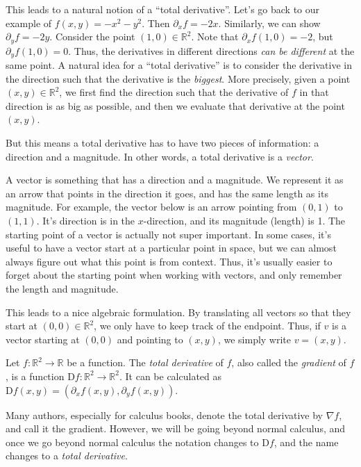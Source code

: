 This leads to a natural notion of a ``total derivative''. Let's go back to our example of $f(x,y) = -x^2 - y^2$. Then $\partial _xf =-2x$. Similarly, we can show $\partial _yf = -2y$. Consider the point $(1,0)\in\mathbb{R} ^2$. Note that $\partial _xf(1,0) = -2$, but $\partial _yf(1,0)=0$. Thus, the derivatives in different directions \emph{can be different} at the same point. A natural idea for a ``total derivative'' is to consider the derivative in the direction such that the derivative is the \emph{biggest}. More precisely, given a point $(x,y)\in\mathbb{R} ^2$, we first find the direction such that the derivative of $f$ in that direction is as big as possible, and then we evaluate that derivative at the point $(x,y)$.

But this means a total derivative has to have two pieces of information: a direction and a magnitude. In other words, a total derivative is a \emph{vector}.

A vector is something that has a direction and a magnitude. We represent it as an arrow that points in the direction it goes, and has the same length as its magnitude. For example, the vector below is an arrow pointing from $(0,1)$ to $(1,1)$. It's direction is in the $x$-direction, and its magnitude (length) is 1. The starting point of a vector is actually not super important. In some cases, it's useful to have a vector start at a particular point in space, but we can almost always figure out what this point is from context. Thus, it's usually easier to forget about the starting point when working with vectors, and only remember the length and magnitude.

This leads to a nice algebraic formulation. By translating all vectors so that they start at $(0,0)\in\mathbb{R} ^2$, we only have to keep track of the endpoint. Thus, if $v$ is a vector starting at $(0,0)$ and pointing to $(x,y)$, we simply write $v=(x,y)$.

\begin{definition}\label{dfn:1-2}
	Let $f : \mathbb{R} ^2 \to \mathbb{R} $ be a function. The \emph{total derivative} of $f$, also called the \emph{gradient} of $f$, is a function $\mathrm{D} f : \mathbb{R} ^2 \to \mathbb{R} ^2$. It can be calculated as $\mathrm{D} f(x,y) = (\partial _xf(x,y), \partial _yf(x,y))$.
\end{definition}

Many authors, especially for calculus books, denote the total derivative by $\nabla f$, and call it the gradient. However, we will be going beyond normal calculus, and once we go beyond normal calculus the notation changes to $\mathrm{D} f$, and the name changes to a \emph{total derivative}.

